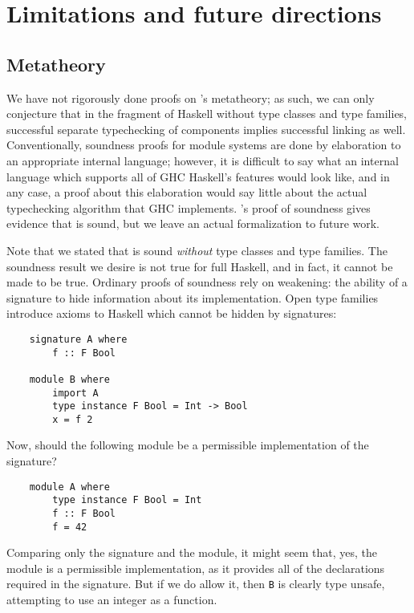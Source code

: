 \chapter{Limitations and future directions}
\label{sec:limitations}

\section{Metatheory}
\label{sec:metatheory}

We have not rigorously done proofs on \Backpack{}'s metatheory; as such,
we can only conjecture that in the fragment of Haskell without type
classes and type families, successful separate typechecking of
components implies successful linking as well.  Conventionally,
soundness proofs for module systems are done by elaboration to an
appropriate internal language; however, it is difficult to say what an
internal language which supports all of GHC Haskell's features would
look like, and in any case, a proof about this elaboration would say
little about the actual typechecking algorithm that GHC
implements.  \OldBackpack{}'s proof
of soundness gives evidence that \Backpack{} is sound, but we leave
an actual formalization to future work.

Note that we stated that \Backpack{} is sound \emph{without} type classes
and type families.  The soundness result we desire is not true for full
Haskell, and in fact, it cannot be made to be true.
Ordinary proofs of soundness rely on weakening: the ability of a signature
to hide information about its implementation.
Open type families~\cite{schrijvers+:typefamilies}
introduce axioms to Haskell which cannot be hidden by signatures:

\begin{lstlisting}
    signature A where
        f :: F Bool

    module B where
        import A
        type instance F Bool = Int -> Bool
        x = f 2
\end{lstlisting}
%
Now, should the following module be a permissible implementation of the
signature?

\begin{lstlisting}
    module A where
        type instance F Bool = Int
        f :: F Bool
        f = 42
\end{lstlisting}
%
Comparing only the signature and the module, it might seem that, yes,
the module is a permissible implementation, as it provides all of the
declarations required in the signature.  But if we do allow it,
then \verb|B| is clearly type unsafe, attempting to use an integer
as a function.

